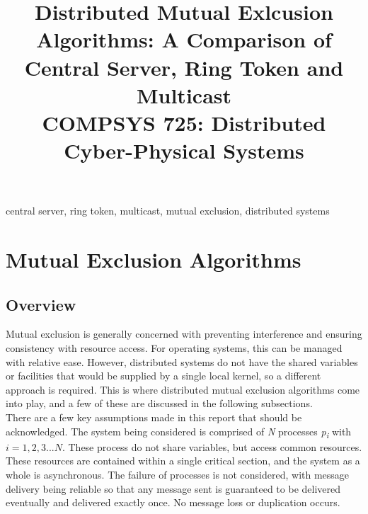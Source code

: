 \documentclass[conference]{IEEEtran}
\begin{document}
\title{Distributed Mutual Exlcusion Algorithms: A Comparison of Central Server,
Ring Token and Multicast\\
{\footnotesize COMPSYS 725: Distributed Cyber-Physical Systems}
}

\author{
}

\maketitle


\begin{IEEEkeywords}
central server, ring token, multicast, mutual exclusion, distributed systems
\end{IEEEkeywords}

\section{Mutual Exclusion Algorithms}
\subsection{Overview}
Mutual exclusion is generally concerned with preventing interference and
ensuring consistency with resource access. For operating systems, this can be
managed with relative ease. However, distributed systems do not have the
shared variables or facilities that would be supplied by a single local kernel,
so a different approach is required. This is where distributed mutual exclusion
algorithms come into play, and a few of these are discussed in the following
subsections. \\
There are a few key assumptions made in this report that should be
acknowledged. The system being considered is comprised of \textit{N} processes
\textit{p\textsubscript{i}} with $i=1,2,3... N$. These process do not share
variables, but access common resources. These resources are contained within
a single critical section, and the system as a whole is asynchronous. The
failure of processes is not considered, with message delivery being reliable so
that any message sent is guaranteed to be delivered eventually and delivered
exactly once. No message loss or duplication occurs.
\end{document}
